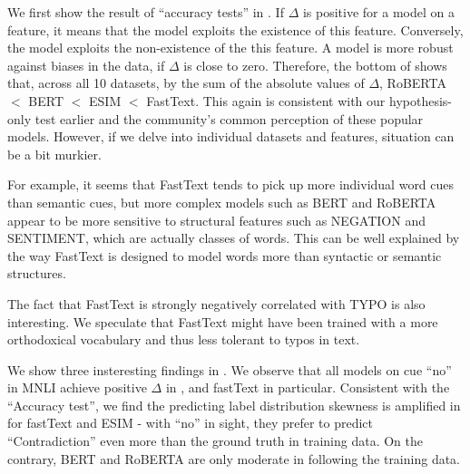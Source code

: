 We first show the result of ``accuracy tests'' in .
If $\Delta$ is positive for a model on a feature, it means that
the model exploits the existence of this feature. Conversely,
the model exploits the non-existence of the this feature.
A model is more robust against biases in the data, if $\Delta$ is
close to zero.
Therefore, the bottom of  shows that,
across all 10 datasets, by the sum of the absolute values of $\Delta$, 
RoBERTA $<$ BERT $<$ ESIM $<$ FastText. This again is consistent with
our hypothesis-only test earlier and 
the community's common perception of these popular models.
However, if we delve into individual datasets and features, 
situation can be a bit murkier.

For example, it seems that FastText tends to pick up more individual word cues
than semantic cues, but more complex models such as BERT
and RoBERTA appear to be more sensitive to structural features such as NEGATION
and SENTIMENT, which are actually classes of words. 
This can be well explained by the way FastText is designed to
model words more than syntactic or semantic structures.

The fact that FastText is strongly negatively correlated with TYPO is
also interesting. We speculate that FastText might have been
trained with a more orthodoxical vocabulary and thus less
tolerant to typos in text. 

We show three insteresting findings in . 
We observe that all models on cue ``no'' in MNLI 
achieve positive $\Delta$ in , and fastText in particular. 
Consistent with the ``Accuracy test'', we find the predicting label distribution 
skewness is amplified in  for fastText and ESIM -  
with ``no'' in sight, they prefer to predict ``Contradiction'' even more
than the ground truth in training data.
On the contrary, BERT and RoBERTA are only moderate in following
the training data. 

